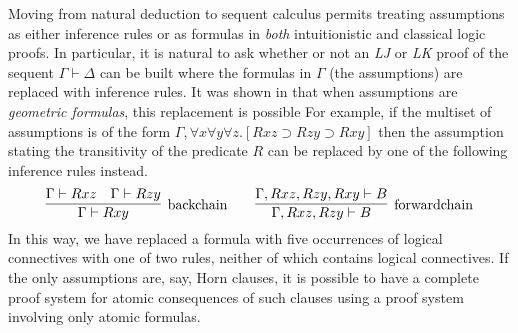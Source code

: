 \documentclass[runningheads]{llncs}
\newcommand\proofsystem[1]{\mbox{\slshape #1}\xspace}
\newcommand\LK   {\proofsystem{LK}}
\newcommand\LJ   {\proofsystem{LJ}}
\newcommand{\imp}{\supset}
\newcommand{\twoseq}[2]{#1\vdash #2}
\newcommand{\R}[2]{R #1 #2}
\begin{document}
Moving from natural deduction to sequent calculus permits treating
assumptions as either inference rules or as formulas in \emph{both}
intuitionistic and classical logic proofs.  In particular, it is
natural to ask whether or not an \LJ or \LK proof of the sequent
$\twoseq{\Gamma}{\Delta}$ can be built where the formulas in $\Gamma$
(the assumptions) are replaced with inference rules.  It was shown in
\cite{negri03aml} that when assumptions are \emph{geometric formulas},
this replacement is possible For example, if the multiset of
assumptions is of the form $\Gamma, \forall x\forall y\forall
z.[\R{x}{z}\imp\R{z}{y}\imp\R{x}{y}]$ then the assumption stating the
transitivity of the predicate $R$ can be replaced by one of the
following inference rules instead.
\[
  \infer[\hbox{backchain}]
        {\twoseq{\Gamma}{\R{x}{y}}}
        {\twoseq{\Gamma}{\R{x}{z}} & \twoseq{\Gamma}{\R{z}{y}}}
  \qquad
  \infer[\hbox{forwardchain}]
        {\twoseq{\Gamma,\R{x}{z},\R{z}{y}}{B}}
        {\twoseq{\Gamma,\R{x}{z},\R{z}{y},\R{x}{y}}{B}}
\]
In this way, we have replaced a formula with five occurrences of
logical connectives with one of two rules, neither of which contains
logical connectives.  If the only assumptions are, say, Horn clauses,
it is possible to have a complete proof system for atomic consequences
of such clauses using a proof system involving only atomic formulas.
\end{document}
